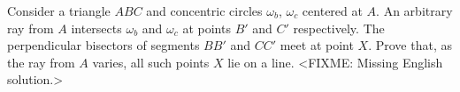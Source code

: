 \problem{}
Consider a triangle $ABC$ and concentric circles $\omega_b$, $\omega_c$
centered at $A$.
An arbitrary ray from $A$ intersects $\omega_b$ and $\omega_c$ at points $B'$
and $C'$ respectively.
The perpendicular bisectors of segments $BB'$ and $CC'$ meet at point $X$.
Prove that, as the ray from $A$ varies, all such points $X$ lie on a line.
\solution
<FIXME: Missing English solution.>
\endproblem
